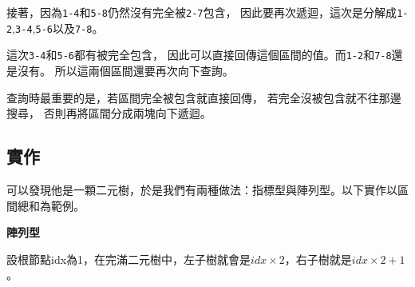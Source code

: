     接著，因為\verb|1-4|和\verb|5-8|仍然沒有完全被\verb|2-7|包含，
    因此要再次遞迴，這次是分解成\verb|1-2|,\verb|3-4|,\verb|5-6|以及\verb|7-8|。

    這次\verb|3-4|和\verb|5-6|都有被完全包含，
    因此可以直接回傳這個區間的值。而\verb|1-2|和\verb|7-8|還是沒有。
    所以這兩個區間還要再次向下查詢。

    查詢時最重要的是，若區間完全被包含就直接回傳，
    若完全沒被包含就不往那邊搜尋，
    否則再將區間分成兩塊向下遞迴。

    \subsection{實作}

    可以發現他是一顆二元樹，於是我們有兩種做法：指標型與陣列型。以下實作以區間總和為範例。

    \textbf{陣列型}

    \begin{tip}
        設根節點idx為1，在完滿二元樹中，左子樹就會是$idx \times 2$，右子樹就是$idx \times 2+1$。
    \end{tip}

